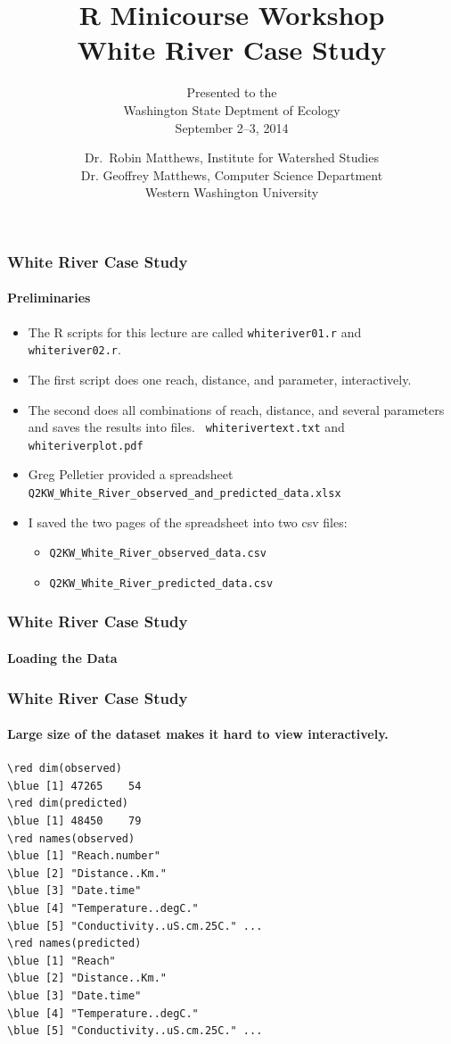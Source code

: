 \documentclass[10pt]{beamer}
\title{R Minicourse Workshop\\White River Case Study}
\author{\small Presented to the\\
        Washington State Deptment of Ecology\\
       September 2--3, 2014}
\date{\scriptsize Dr.~Robin Matthews, Institute for Watershed Studies\\
   Dr. Geoffrey Matthews, Computer Science Department\\
   Western Washington University}
\newcommand{\red}{\color{red}}
\newcommand{\blue}{\color{blue}}
\newcommand{\iwsframe}[2]{
\begin{frame}[fragile]
\frametitle{#1}
\framesubtitle{#2}
}
\begin{document}
\newcommand{\be}{\begin{enumerate}}
\newcommand{\ee}{\end{enumerate}}
\newcommand{\bi}{\begin{itemize}}
\newcommand{\ei}{\end{itemize}}
\newcommand{\bd}{\begin{description}}
\newcommand{\ed}{\end{description}}


\begin{frame}
\titlepage
\end{frame}

\iwsframe{White River Case Study}{Preliminaries}
\bi
\item The R scripts for this lecture are called {\tt \blue whiteriver01.r}
  and {\tt \blue whiteriver02.r}.
\item The first script does one reach, distance, and parameter,
  interactively.
\item  The second
  does all combinations of reach, distance, and several
  parameters and saves the results into files. {\tt \blue
    whiterivertext.txt} and {\tt \blue whiteriverplot.pdf}
\item Greg Pelletier provided a spreadsheet
{\blue  \verb|Q2KW_White_River_observed_and_predicted_data.xlsx|}
\item I saved the two pages of the spreadsheet into two  csv files:
\bi
\item{\blue \verb|Q2KW_White_River_observed_data.csv|}
\item{\blue \verb|Q2KW_White_River_predicted_data.csv|}
\ei
\ei

\end{frame}


\iwsframe{White River Case Study}{Loading the Data} 
\VerbatimInput[fontsize=\scriptsize,firstline=12,lastline=26,formatcom=\red]{whiteriver01.r}

\end{frame}


\iwsframe{White River Case Study}{Large size of the dataset makes it hard to view interactively.}

\begin{Verbatim}[fontsize=\scriptsize,commandchars=\\\{\}]
\red dim(observed)
\blue [1] 47265    54
\red dim(predicted)
\blue [1] 48450    79
\red names(observed)
\blue [1] "Reach.number" 
\blue [2] "Distance..Km."                     
\blue [3] "Date.time"
\blue [4] "Temperature..degC."                
\blue [5] "Conductivity..uS.cm.25C." ...
\red names(predicted)
\blue [1] "Reach"
\blue [2] "Distance..Km." 
\blue [3] "Date.time"     
\blue [4] "Temperature..degC."  
\blue [5] "Conductivity..uS.cm.25C." ...
\end{Verbatim}
\end{frame}
\end{document}
